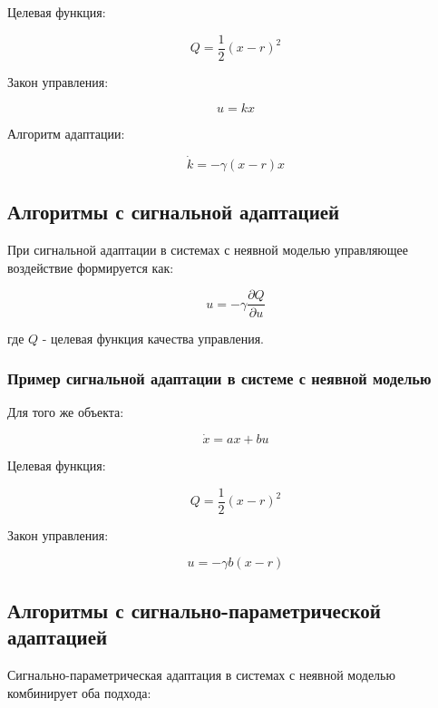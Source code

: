 \documentclass[a4paper,14pt]{extarticle} %
\begin{document}
Целевая функция:

\begin{equation}
Q = \frac{1}{2}(x - r)^2
\end{equation}

Закон управления:

\begin{equation}
u = kx
\end{equation}

Алгоритм адаптации:

\begin{equation}
\dot{k} = -\gamma (x - r)x
\end{equation}

\subsection{Алгоритмы с сигнальной адаптацией}
При сигнальной адаптации в системах с неявной моделью управляющее воздействие формируется как:

\begin{equation}
u = -\gamma \frac{\partial Q}{\partial u}
\end{equation}

где $Q$ - целевая функция качества управления.

\subsubsection{Пример сигнальной адаптации в системе с неявной моделью}
Для того же объекта:

\begin{equation}
\dot{x} = ax + bu
\end{equation}

Целевая функция:

\begin{equation}
Q = \frac{1}{2}(x - r)^2
\end{equation}

Закон управления:

\begin{equation}
u = -\gamma b(x - r)
\end{equation}

\subsection{Алгоритмы с сигнально-параметрической адаптацией}
Сигнально-параметрическая адаптация в системах с неявной моделью комбинирует оба подхода:
\end{document}
